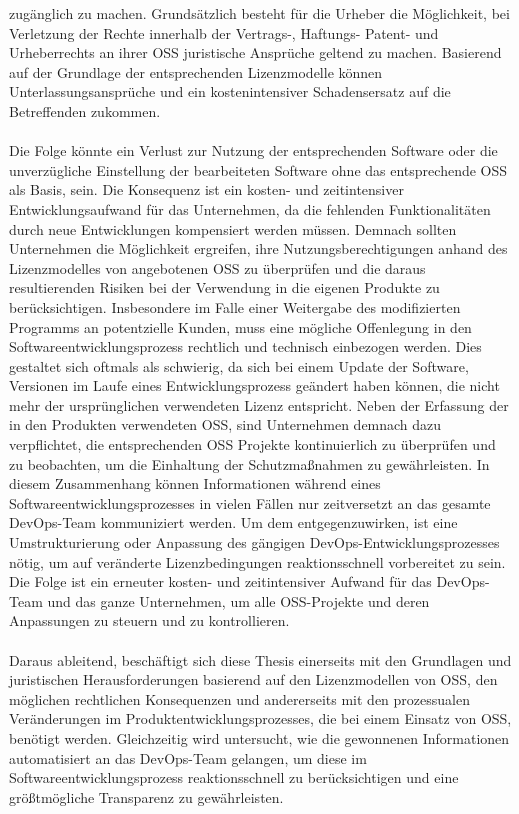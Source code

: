 zugänglich zu machen. Grundsätzlich besteht für die Urheber die Möglichkeit, bei Verletzung der Rechte innerhalb der Vertrags-, Haftungs- Patent- und Urheberrechts an ihrer OSS juristische Ansprüche geltend zu machen. Basierend auf der Grundlage der entsprechenden Lizenzmodelle können Unterlassungsansprüche und ein kostenintensiver Schadensersatz auf die Betreffenden zukommen. \cite{helmreich_geschaftsrisiken_2012}\\\\ Die Folge könnte ein Verlust zur Nutzung der entsprechenden Software oder die unverzügliche Einstellung der bearbeiteten Software ohne das entsprechende OSS als Basis, sein. Die Konsequenz ist ein kosten- und zeitintensiver Entwicklungsaufwand für das Unternehmen, da die fehlenden Funktionalitäten durch neue Entwicklungen kompensiert werden müssen. Demnach sollten Unternehmen die Möglichkeit ergreifen, ihre Nutzungsberechtigungen anhand des Lizenzmodelles von angebotenen OSS zu überprüfen und die daraus resultierenden Risiken bei der Verwendung in die eigenen Produkte zu berücksichtigen. Insbesondere im Falle einer Weitergabe des modifizierten Programms an potentzielle Kunden, muss eine mögliche Offenlegung in den Softwareentwicklungsprozess rechtlich und technisch einbezogen werden. Dies gestaltet sich oftmals als schwierig, da sich bei einem Update der Software, Versionen im Laufe eines Entwicklungsprozess geändert haben können, die nicht mehr der ursprünglichen verwendeten Lizenz entspricht. Neben der Erfassung der in den Produkten verwendeten OSS, sind Unternehmen demnach dazu verpflichtet, die entsprechenden OSS Projekte kontinuierlich zu überprüfen und zu beobachten, um die Einhaltung der Schutzmaßnahmen zu gewährleisten. In diesem Zusammenhang können Informationen während eines Softwareentwicklungsprozesses in vielen Fällen nur zeitversetzt an das gesamte DevOps-Team kommuniziert werden. Um dem entgegenzuwirken, ist eine Umstrukturierung oder Anpassung des gängigen DevOps-Entwicklungsprozesses nötig, um auf veränderte Lizenzbedingungen reaktionsschnell vorbereitet zu sein. Die Folge ist ein erneuter kosten- und zeitintensiver Aufwand für das DevOps-Team und das ganze Unternehmen, um alle OSS-Projekte und deren Anpassungen zu steuern und zu kontrollieren. \\\\Daraus ableitend, beschäftigt sich diese Thesis einerseits mit den Grundlagen und juristischen Herausforderungen basierend auf den Lizenzmodellen von OSS, den möglichen rechtlichen Konsequenzen und andererseits mit den prozessualen Veränderungen im Produktentwicklungsprozesses, die bei einem Einsatz von OSS, benötigt werden. Gleichzeitig wird untersucht, wie die gewonnenen Informationen automatisiert an das DevOps-Team gelangen, um diese im Softwareentwicklungsprozess reaktionsschnell zu berücksichtigen und eine größtmögliche Transparenz zu gewährleisten.  

